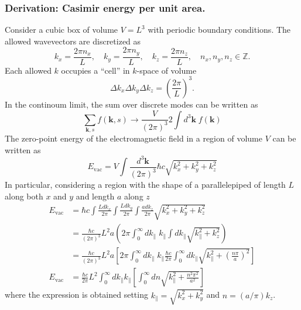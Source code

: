 \documentclass[../../../main.tex]{subfiles}
\begin{document}
\subsubsection{Derivation: Casimir energy per unit area.}
Consider a cubic box of volume \( V = L^3 \) with periodic boundary conditions. The allowed wavevectors are discretized as
\begin{equation*}
  k_x = \frac{2\pi n_x}{L}, \quad k_y = \frac{2\pi n_y}{L}, \quad k_z = \frac{2\pi n_z}{L}, \quad n_x, n_y, n_z \in \mathbb{Z}.
\end{equation*}
Each allowed \( k \) occupies a ``cell'' in \( k \)-space of volume
\begin{equation*}
  \Delta k_x \Delta k_y \Delta k_z = \left( \frac{2\pi}{L} \right)^3.
\end{equation*}
In the continoum limit, the sum over discrete modes can be written as
\begin{equation*}
  \sum_{\mathbf{k},s} f(\mathbf{k},s) \rightarrow  \frac{V}{(2\pi)^{3}} 2\int d^{3}\mathbf{k} \; f(\mathbf{k})
\end{equation*}
The zero-point energy of the electromagnetic ﬁeld in a region of volume $V$ can be written as
\begin{equation*}
  E_\text{vac}=
  V \int \frac{d^{3}\mathbf{k}}{(2\pi)^{3}} \hbar c \sqrt{k_{x}^{2} + k_{y}^{2} + k_{z}^{2}}
\end{equation*}
In particular, considering a region with the shape of a parallelepiped of length $L$ along both $x$ and $y$ and length $a$ along $z$
\begin{align*}
  E_\text{vac} & = \hbar c \int  \frac{L dk_{x}}{2\pi} \int \frac{L dk_{y}}{2\pi} \int  \frac{a dk_{z}}{2\pi} \sqrt{k_{x}^{2} + k_{y}^{2} + k_{z}^{2}}                                                                           \\
               & = \frac{\hbar  c }{(2\pi)^3 }L^2 a \left( 2\pi \int_{0 }^{\infty }dk_{\parallel}\;k_{\parallel}\int dk_{\parallel}\sqrt{k_{\parallel}^2+k_z^2} \right)                                                          \\
               & = \frac{\hbar  c }{(2\pi)^3 }L^2 a \left[ 2\pi \int_{0 }^{\infty }dk_{\parallel}\;k_{\parallel}\frac{\hbar c}{2\pi}\int_0^\infty dk_{\parallel}\sqrt{k_{\parallel}^2+\left( \frac{n \pi}{a} \right) ^2} \right] \\
  E_\text{vac}
               & =  \frac{\hbar c}{2\pi} L^{2} \int_{0}^{\infty} dk_{\parallel}k_{\parallel}\left[\int_{0}^{\infty} dn \sqrt{k_{\parallel}^{2} + \frac{n^{2} \pi^{2}}{a^{2}}}\right]
\end{align*}
where the expression is obtained setting $k_{\parallel} = \sqrt{k_{x}^{2} + k_{y}^{2}}$ and $n = (a/\pi)k_{z}$.
\end{document}
